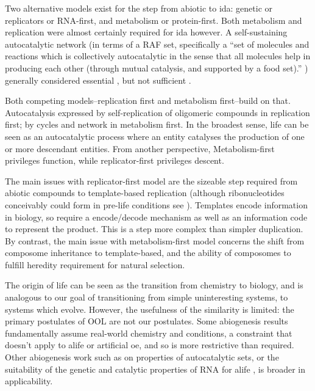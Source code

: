 \begin{mdframed}[style=box, frametitle={The orgins of life}]
Two alternative models exist for the step from abiotic to \gls{ida}: genetic or replicators or RNA-first, and metabolism or protein-first. Both metabolism and replication were almost certainly required for \gls{ida} however. A self-sustaining autocatalytic network (in terms of a RAF set, specifically a ``set of molecules and reactions which is collectively autocatalytic in the sense that all molecules help in producing each other (through mutual catalysis, and supported by a food set).'' \parencite{Hordijk2011}) generally considered essential \parencite{Pross2013}, but not sufficient \parencite{Hordijk2011}. 


Both competing models--replication first and metabolism first--build on that. Autocatalysis expressed by self-replication of oligomeric compounds in replication first; by cycles and network in metabolism first. In the broadest sense, life can be seen as an autocatalytic process where an entity catalyses the production of one or more descendant entities. From another perspective, Metabolism-first privileges function, while replicator-first privileges descent.

The main issues with replicator-first model are the sizeable step required from abiotic compounds to template-based replication (although ribonucleotides conceivably could form in pre-life conditions see \parencite{Powner2009}). Templates encode information in biology, so require a encode/decode mechanism as well as an information code to represent the product. This is a step more complex than simpler duplication. By contrast, the main issue with metabolism-first model concerns the shift from composome inheritance to template-based, and the ability of composomes to fulfill heredity requirement for natural selection.

The origin of life can be seen as the transition from chemistry to biology, and is analogous to our goal of transitioning from simple uninteresting systems, to systems which evolve. However, the usefulness of the similarity is limited: the primary postulates of OOL are not our postulates. Some abiogenesis results fundamentally assume real-world chemistry and
conditions, a constraint that doesn't apply to \gls{alife} or artificial \gls{oe}, and so is more restrictive than required. Other abiogenesis work such as on properties of autocatalytic sets, or the suitability of the genetic and catalytic properties of RNA for \gls{alife} \parencite{Cheng2010}, is broader in applicability.
\end{mdframed}

